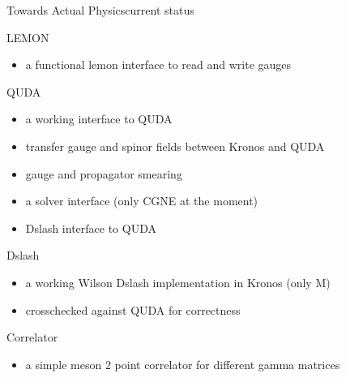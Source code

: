 \begin{frame}{Towards Actual Physics}{current status}

  \begin{bkblock}{LEMON}
    \begin{itemize}
      \item a functional lemon interface to read and write gauges
    \end{itemize}
  \end{bkblock}

  \begin{bkalertblock}{QUDA}
    \begin{itemize}
      \item a working interface to QUDA
      \item transfer gauge and spinor fields between Kronos and QUDA
      \item gauge and propagator smearing
      \item a solver interface (only CGNE at the moment)
      \item Dslash interface to QUDA
    \end{itemize}
  \end{bkalertblock}

  \begin{bkexampleblock}{Dslash}
    \begin{itemize}
      \item a working Wilson Dslash implementation in Kronos (only M)
      \item crosschecked against QUDA for correctness
    \end{itemize}
  \end{bkexampleblock}

  \begin{bkblock}{Correlator}
    \begin{itemize}
      \item a simple meson 2 point correlator for different gamma matrices
    \end{itemize}
  \end{bkblock}

\end{frame}


